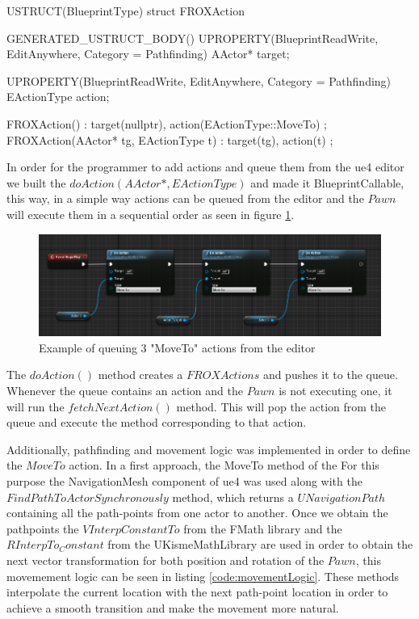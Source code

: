 \begin{listing}[language=C++, caption=FROXAction struct, frame=single, label=code:actionStruct]
	USTRUCT(BlueprintType)
	struct FROXAction
	{
		GENERATED_USTRUCT_BODY()
		UPROPERTY(BlueprintReadWrite, EditAnywhere, Category = Pathfinding)
		AActor* target;
		
		UPROPERTY(BlueprintReadWrite, EditAnywhere, Category = Pathfinding)
		EActionType action;
		
		FROXAction() : target(nullptr), action(EActionType::MoveTo) {};
		FROXAction(AActor* tg, EActionType t) : target(tg), action(t) {};
	}
\end{listing}

In order for the programmer to add actions and queue them from the \gls{ue4} editor we built the $doAction(AActor*, EActionType)$ and made it BlueprintCallable, this way, in a simple way actions can be queued from the editor and the $Pawn$ will execute them in a sequential order as seen in figure \ref{action_queue}.

\begin{figure}[h]
	\includegraphics[scale=0.4]{archivos/action_queue.png}
	\centering
	\caption{Example of queuing 3 "MoveTo" actions from the editor}
	\label{action_queue}
\end{figure}

The $doAction()$ method creates a $FROXActions$ and pushes it to the queue. Whenever the queue contains an action and the $Pawn$ is not executing one, it will run the $fetchNextAction()$ method. This will pop the action from the queue and execute the method corresponding to that action.



Additionally, pathfinding and movement logic was implemented in order to define the $MoveTo$ action. In a first approach, the MoveTo method of the  For this purpose the NavigationMesh component of \gls{ue4} was used along with the $FindPathToActorSynchronously$ method, which returns a $UNavigationPath$ containing all the path-points from one actor to another. Once we obtain the pathpoints the $VInterpConstantTo$ from the FMath library and the $RInterpTo_Constant$ from the UKismeMathLibrary are used in order to obtain the next vector transformation for both position and rotation of the $Pawn$, this movemement logic can be seen in listing \ref{code:movementLogic}. These methods interpolate the current location with the next path-point location in order to achieve a smooth transition and make the movement more natural.

